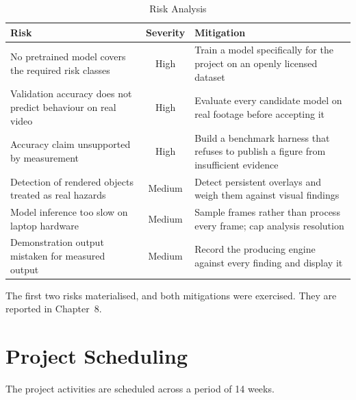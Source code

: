 \documentclass[
12pt,
a4paper,
oneside
]{report}
\begin{document}
\begin{table}[H]
\centering
\begin{tabular}{|p{4.8cm}|c|p{5.6cm}|}
\hline
\textbf{Risk} & \textbf{Severity} & \textbf{Mitigation} \\
\hline
No pretrained model covers the required risk classes & High & Train a model
specifically for the project on an openly licensed dataset \\
\hline
Validation accuracy does not predict behaviour on real video & High & Evaluate
every candidate model on real footage before accepting it \\
\hline
Accuracy claim unsupported by measurement & High & Build a benchmark harness
that refuses to publish a figure from insufficient evidence \\
\hline
Detection of rendered objects treated as real hazards & Medium & Detect
persistent overlays and weigh them against visual findings \\
\hline
Model inference too slow on laptop hardware & Medium & Sample frames rather
than process every frame; cap analysis resolution \\
\hline
Demonstration output mistaken for measured output & Medium & Record the
producing engine against every finding and display it \\
\hline
\end{tabular}
\caption{Risk Analysis}
\end{table}

The first two risks materialised, and both mitigations were exercised. They are
reported in Chapter~8.

\section{Project Scheduling}

The project activities are scheduled across a period of 14 weeks.
\end{document}
